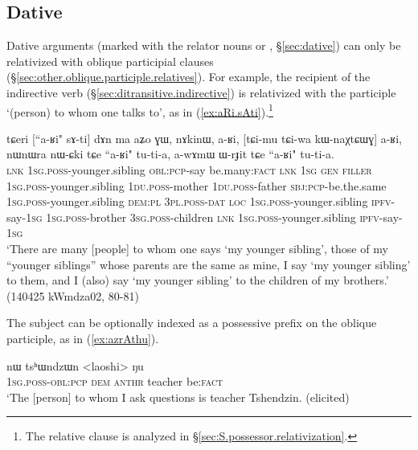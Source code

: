 \subsection{Dative} \label{sec:dative.relativization}
Dative arguments (marked with the relator nouns  or , §\ref{sec:dative}) can only be relativized with oblique participial clauses (§\ref{sec:other.oblique.participle.relatives}). For example, the recipient of the indirective verb  (§\ref{sec:ditransitive.indirective}) is relativized with the participle  `(person) to whom one talks to', as in (\ref{ex:aRi.sAti}).\footnote{The relative clause  is analyzed in §\ref{sec:S.possessor.relativization}.}

\begin{exe}
\ex \label{ex:aRi.sAti}
\gll tɕeri [``a-ʁi" sɤ-ti] dɤn ma aʑo ɣɯ, nɤkinɯ, a-ʁi, [tɕi-mu tɕi-wa kɯ-naχtɕɯɣ] a-ʁi, 
nɯnɯra nɯ-ɕki tɕe ``a-ʁi" tu-ti-a, a-wɤmɯ ɯ-rɟit tɕe ``a-ʁi" tu-ti-a. \\
\textsc{lnk} \textsc{1sg}.\textsc{poss}-younger.sibling \textsc{obl}:\textsc{pcp}-say be.many:\textsc{fact} \textsc{lnk} \textsc{1sg} \textsc{gen} \textsc{filler} \textsc{1sg}.\textsc{poss}-younger.sibling  \textsc{1du}.\textsc{poss}-mother  \textsc{1du}.\textsc{poss}-father \textsc{sbj}:\textsc{pcp}-be.the.same  \textsc{1sg}.\textsc{poss}-younger.sibling \textsc{dem}:\textsc{pl} \textsc{3pl}.\textsc{poss}-\textsc{dat} \textsc{loc}  \textsc{1sg}.\textsc{poss}-younger.sibling \textsc{ipfv}-say-\textsc{1sg} \textsc{1sg}.\textsc{poss}-brother \textsc{3sg}.\textsc{poss}-children \textsc{lnk} \textsc{1sg}.\textsc{poss}-younger.sibling \textsc{ipfv}-say-\textsc{1sg}  \\
\glt `There are many [people] to whom one says `my younger sibling', those of my ``younger siblings'' whose parents are the same as mine, I say `my younger sibling' to them, and I (also) say  `my younger sibling' to the children of my brothers.' (140425 kWmdza02, 80-81)
\end{exe}

The subject can be optionally indexed as a possessive prefix on the oblique participle, as in (\ref{ex:azrAthu}).

\begin{exe}
\ex \label{ex:azrAthu}
\gll [a-z-rɤ-tʰu] nɯ tsʰɯndzɯn <laoshi> ŋu \\
\textsc{1sg}.\textsc{poss}-\textsc{obl}:\textsc{pcp} \textsc{dem}  \textsc{anthr} teacher be:\textsc{fact} \\
\glt `The [person] to whom I ask questions is teacher Tshendzin. (elicited)
\end{exe}

